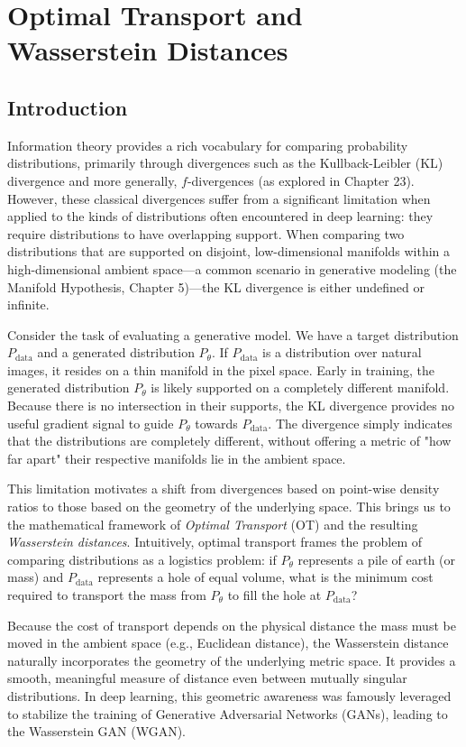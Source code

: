 \chapter{Optimal Transport and Wasserstein Distances}
\label{chap:optimal_transport}

\section{Introduction}
Information theory provides a rich vocabulary for comparing probability distributions, primarily through divergences such as the Kullback-Leibler (KL) divergence and more generally, $f$-divergences (as explored in Chapter 23). However, these classical divergences suffer from a significant limitation when applied to the kinds of distributions often encountered in deep learning: they require distributions to have overlapping support. When comparing two distributions that are supported on disjoint, low-dimensional manifolds within a high-dimensional ambient space—a common scenario in generative modeling (the Manifold Hypothesis, Chapter 5)—the KL divergence is either undefined or infinite.

Consider the task of evaluating a generative model. We have a target distribution $P_{\text{data}}$ and a generated distribution $P_\theta$. If $P_{\text{data}}$ is a distribution over natural images, it resides on a thin manifold in the pixel space. Early in training, the generated distribution $P_\theta$ is likely supported on a completely different manifold. Because there is no intersection in their supports, the KL divergence provides no useful gradient signal to guide $P_\theta$ towards $P_{\text{data}}$. The divergence simply indicates that the distributions are completely different, without offering a metric of "how far apart" their respective manifolds lie in the ambient space.

This limitation motivates a shift from divergences based on point-wise density ratios to those based on the geometry of the underlying space. This brings us to the mathematical framework of \emph{Optimal Transport} (OT) and the resulting \emph{Wasserstein distances}. Intuitively, optimal transport frames the problem of comparing distributions as a logistics problem: if $P_\theta$ represents a pile of earth (or mass) and $P_{\text{data}}$ represents a hole of equal volume, what is the minimum cost required to transport the mass from $P_\theta$ to fill the hole at $P_{\text{data}}$? 

Because the cost of transport depends on the physical distance the mass must be moved in the ambient space (e.g., Euclidean distance), the Wasserstein distance naturally incorporates the geometry of the underlying metric space. It provides a smooth, meaningful measure of distance even between mutually singular distributions. In deep learning, this geometric awareness was famously leveraged to stabilize the training of Generative Adversarial Networks (GANs), leading to the Wasserstein GAN (WGAN). 

